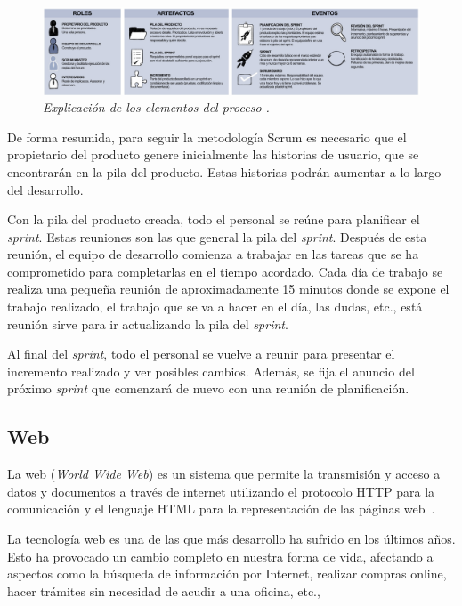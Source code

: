 \begin{figure}
	\centering
	\includegraphics[width=\textwidth]{../img/Scrum/Scrum1.png}
	\caption{\textit{Explicación de los elementos del proceso \cite{scrum}.}}\label{ProcesoScrum2}
\end{figure}


De forma resumida, para seguir la metodología Scrum es necesario que el propietario del producto genere inicialmente las historias de usuario, que se encontrarán en la pila del producto. Estas historias podrán aumentar a lo largo del desarrollo.

Con la pila del producto creada, todo el personal se reúne para planificar el \textit{sprint}. Estas reuniones son las que general la pila del \textit{sprint}.
Después de esta reunión, el equipo de desarrollo comienza a trabajar en las tareas que se ha comprometido para completarlas en el tiempo acordado. Cada día de trabajo se realiza una pequeña reunión de aproximadamente 15 minutos donde se expone el trabajo realizado, el trabajo que se va a hacer en el día, las dudas, etc., está reunión sirve para ir actualizando la pila del \textit{sprint}. 

Al final del \textit{sprint}, todo el personal se vuelve a reunir para presentar el incremento realizado y ver posibles cambios. Además, se fija el anuncio del próximo \textit{sprint} que comenzará de nuevo con una reunión de planificación.


\subsection{Web}
La web (\textit{World Wide Web}) es un sistema que permite la transmisión y acceso a datos y documentos a través de internet utilizando el protocolo HTTP para la comunicación y el lenguaje HTML para la representación de las páginas web~\cite{wiki:web}.

La tecnología web es una de las que más desarrollo ha sufrido en los últimos años. Esto ha provocado un cambio completo en nuestra forma de vida, afectando a aspectos como la búsqueda de información por Internet, realizar compras online, hacer trámites sin necesidad de acudir a una oficina, etc.,

